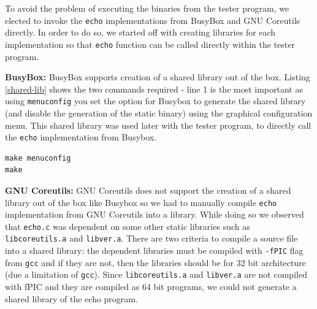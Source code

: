\documentclass[conference]{IEEEtran}
\begin{document}
To avoid the problem of executing the binaries from the tester program, we elected to invoke the {\tt echo} implementations from BusyBox and GNU Coreutils directly. In order to do so, we started off with creating libraries for each implementation so that {\tt echo} function can be called directly within the tester program. 

\textbf{BusyBox:} BusyBox supports creation of a shared library out of the box. Listing \ref{shared-lib} shows the two commands required - line 1 is the most important as using {\tt menuconfig} you set the option for Busybox to generate the shared library (and disable the generation of the static binary) using the graphical configuration menu. This shared library was used later with the tester program, to directly call the {\tt echo} implementation from Busybox. \\

\begin{lstlisting}[style=bash, label=shared-lib, abovecaptionskip=2ex, captionpos=b, caption={Commands for building GNU Coreutils as a static library}]
make menuconfig
make
\end{lstlisting}

\textbf{GNU Coreutils:} GNU Coreutils does not support the creation of a shared library out of the box like Busybox so we had to manually compile {\tt echo} implementation from GNU Coreutils into a library. While doing so we observed that {\tt echo.c} was dependent on some other static libraries such as {\tt libcoreutils.a} and {\tt libver.a}. There are two criteria to compile a source file into a shared library: the dependent libraries must be compiled with  {\tt -fPIC} flag from {\tt gcc} and if they are not, then the libraries should be for 32 bit architecture (due a limitation of {\tt gcc}). Since {\tt libcoreutils.a} and {\tt libver.a} are not compiled with fPIC and they are compiled as 64 bit programs, we could not generate a shared library of the echo program. 
\end{document}
